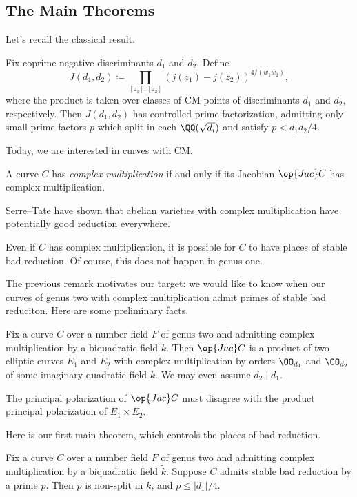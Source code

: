 \documentclass{article}
\begin{document}
\subsection{The Main Theorems}
Let's recall the classical result.
\begin{theorem}
	Fix coprime negative discriminants $d_1$ and $d_2$. Define
	\[J(d_1,d_2)\coloneqq\prod_{[z_1],[z_2]}(j(z_1)-j(z_2))^{4/(w_1w_2)},\]
	where the product is taken over classes of CM points of discriminants $d_1$ and $d_2$, respectively. Then $J(d_1,d_2)$ has controlled prime factorization, admitting only small prime factors $p$ which split in each $\QQ(\sqrt{d_i})$ and satisfy $p<d_1d_2/4$.
\end{theorem}
Today, we are interested in curves with CM.
\begin{definition}
	A curve $C$ has \textit{complex multiplication} if and only if its Jacobian $\op{Jac}C$ has complex multiplication.
\end{definition}
\begin{remark}
	Serre--Tate have shown that abelian varieties with complex multiplication have potentially good reduction everywhere.
\end{remark}
\begin{remark}
	Even if $C$ has complex multiplication, it is possible for $C$ to have places of stable bad reduction. Of course, this does not happen in genus one.
\end{remark}
The previous remark motivates our target: we would like to know when our curves of genus two with complex multiplication admit primes of stable bad reduciton. Here are some preliminary facts.
\begin{theorem}
	Fix a curve $C$ over a number field $F$ of genus two and admitting complex multiplication by a biquadratic field $\widetilde k$. Then $\op{Jac}C$ is a product of two elliptic curves $E_1$ and $E_2$ with complex multiplication by orders $\OO_{d_1}$ and $\OO_{d_2}$ of some imaginary quadratic field $k$. We may even assume $d_2\mid d_1$.
\end{theorem}
\begin{remark}
	The principal polarization of $\op{Jac}C$ must disagree with the product principal polarization of $E_1\times E_2$.
\end{remark}
Here is our first main theorem, which controls the places of bad reduction.
\begin{theorem} \label{thm:control-bad}
	Fix a curve $C$ over a number field $F$ of genus two and admitting complex multiplication by a biquadratic field $\widetilde k$. Suppose $C$ admits stable bad reduction by a prime $p$. Then $p$ is non-split in $k$, and $p\le\left|d_1\right|/4$.
\end{theorem}
\end{document}
